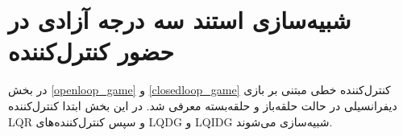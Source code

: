 \section{شبیه‌سازی استند سه درجه آزادی در حضور کنترل‌کننده}
در بخش
\ref{openloop_game}
و
\ref{closedloop_game}
کنترل‌کننده خطی مبتنی بر بازی دیفرانسیلی در حالت حلقه‌باز و حلقه‌بسته معرفی شد. در این بخش ابتدا کنترل‌کننده LQR و سپس کنترل‌کننده‌های LQDG و LQIDG شبیه‌سازی می‌شوند.
